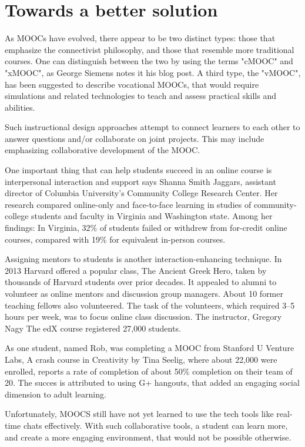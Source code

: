 \section{Towards a better solution}
As MOOCs have evolved, there appear to be two distinct types: those that
emphasize the connectivist philosophy, and those that resemble more traditional
courses. One can distinguish between the two by using the terms "cMOOC" and
"xMOOC", as George Siemens notes it his blog post\citep{moocs_are_a_platform}.
A third type, the "vMOOC", has been suggested to describe
vocational MOOCs, that would require simulations and related technologies to
teach and assess practical skills and abilities.

Such instructional design approaches attempt to connect learners to each other
to answer questions and/or collaborate on joint projects. This may include
emphasizing collaborative development of the MOOC.

One important thing that can help students succeed in an online course is
interpersonal interaction and support says Shanna Smith Jaggars, assistant
director of Columbia University's Community College Research Center. Her
research compared online-only and face-to-face learning in studies of
community-college students and faculty in Virginia and Washington state. Among
her findings: In Virginia, 32\% of students failed or withdrew from for-credit
online courses, compared with 19\% for equivalent in-person courses.\citep{early_report_on_moocs}

Assigning mentors to students is another interaction-enhancing technique.
In 2013 Harvard offered a popular class, The Ancient Greek Hero, taken by
thousands of Harvard students over prior decades. It appealed to alumni to
volunteer as online mentors and discussion group managers. About 10 former
teaching fellows also volunteered. The task of the volunteers, which required
3–5 hours per week, was to focus online class discussion. The instructor,
Gregory Nagy The edX course registered 27,000 students.

As one student, named Rob, was completing a MOOC  from Stanford U Venture Labs, A crash course in
Creativity by Tina Seelig, where about 22,000 were enrolled, reports a rate of
completion of about 50\% completion on their team of 20. The succes is
attributed to using G+ hangouts, that added an engaging social dimension to adult learning.

Unfortunately, MOOCS still have not yet learned to use the tech tools like
real-time chats effectively. With such collaborative tools, a student can learn
more, and create a more engaging environment, that would not be possible otherwise.

